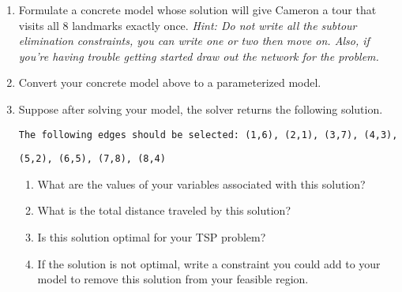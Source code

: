 \documentclass[11pt]{article}
\theoremstyle{definition}
\begin{document}
\begin{enumerate}
\item Formulate a concrete model whose solution will give Cameron a tour that visits all 8 landmarks exactly once. \emph{Hint: Do not write all the subtour elimination constraints, you can write one or two then move on. Also, if you're having trouble getting started draw out the network for the problem.}
\item Convert your concrete model above to a parameterized model.
\item Suppose after solving your model, the solver returns the following solution. 

\verb|The following edges should be selected: (1,6), (2,1), (3,7), (4,3),| 

\verb|(5,2), (6,5), (7,8), (8,4)|
	\begin{enumerate}
	\item What are the values of your variables associated with this solution?
	\item What is the total distance traveled by this solution?
	\item Is this solution optimal for your TSP problem?
	\item If the solution is not optimal, write a constraint you could add to your model to remove this solution from your feasible region.
	\end{enumerate}
\end{enumerate}
\end{document}
